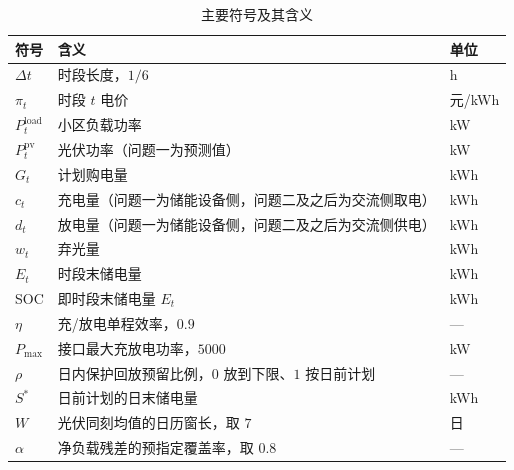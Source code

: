 \begin{table}[H]
  \centering
  \small
  \caption{主要符号及其含义}
  \label{tab:symbols}
  \begingroup


  \renewcommand{\arraystretch}{1.15}
  \setlength{\tabcolsep}{6pt}

  \begin{tabular}{lll}
    \toprule

    \rowcolor{headerblue}
    符号 & 含义 & 单位 \\

    \midrule

    $\Delta t$ & 时段长度，$1/6$ & h \\

    \rowcolor{rowblue}
    $\pi_t$ & 时段 $t$ 电价 & 元/kWh \\

    $P^{\mathrm{load}}_t$ & 小区负载功率 & kW \\

    \rowcolor{rowblue}
    $P^{\mathrm{pv}}_t$ & 光伏功率（问题一为预测值） & kW \\

    $G_t$ & 计划购电量 & kWh \\

    \rowcolor{rowblue}
    $c_t$ & 充电量（问题一为储能设备侧，问题二及之后为交流侧取电） & kWh \\

    $d_t$ & 放电量（问题一为储能设备侧，问题二及之后为交流侧供电） & kWh \\

    \rowcolor{rowblue}
    $w_t$ & 弃光量 & kWh \\

    $E_t$ & 时段末储电量 & kWh \\

    \rowcolor{rowblue}
    SOC & 即时段末储电量 $E_t$ & kWh \\

    $\eta$ & 充/放电单程效率，$0.9$ & — \\

    \rowcolor{rowblue}
    $P_{\max}$ & 接口最大充放电功率，$5000$ & kW \\

    $\rho$ & 日内保护回放预留比例，$0$ 放到下限、$1$ 按日前计划 & — \\

    \rowcolor{rowblue}
    $S^{*}$ & 日前计划的日末储电量 & kWh \\

    $W$ & 光伏同刻均值的日历窗长，取 $7$ & 日 \\

    \rowcolor{rowblue}
    $\alpha$ & 净负载残差的预指定覆盖率，取 $0.8$ & — \\

    \bottomrule
  \end{tabular}

  \endgroup

\end{table}
